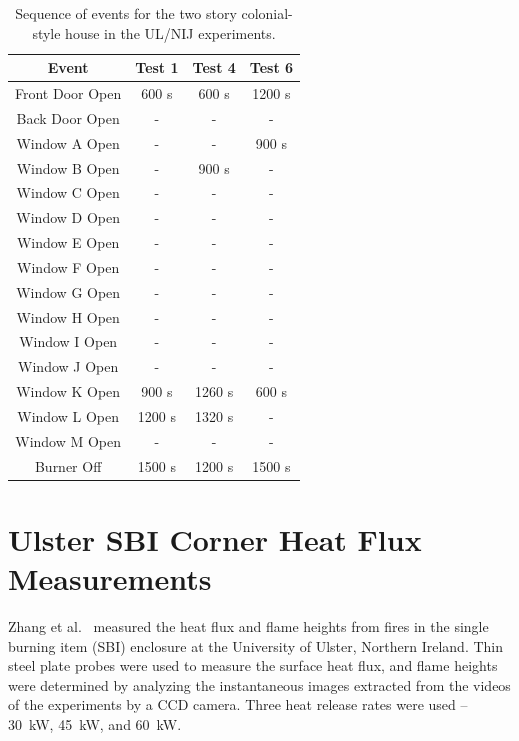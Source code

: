 \begin{table}[ht!]
\begin{center}
\begin{tabular}{|c||c|c|c|}
\hline
Event 			& Test 1  	& Test 4 	& Test 6 	\\ \hline \hline
Front Door Open & 600 s 	& 600 s 	& 1200 s 	\\ \hline
Back Door Open  & - 		& - 		& - 		\\ \hline
Window A Open  	& - 		& - 		& 900 s 	\\ \hline
Window B Open  	& - 		& 900 s 	& - 		\\ \hline
Window C Open  	& - 		& - 		& - 		\\ \hline
Window D Open  	& - 		& - 		& - 		\\ \hline
Window E Open  	& - 		& - 		& - 		\\ \hline
Window F Open  	& - 		& - 		& - 		\\ \hline
Window G Open  	& - 		& - 		& - 		\\ \hline
Window H Open  	& - 		& - 		& - 		\\ \hline
Window I Open  	& - 		& - 		& - 		\\ \hline
Window J Open  	& - 		& - 		& - 		\\ \hline
Window K Open  	& 900 s 	& 1260 s 	& 600 s 	\\ \hline
Window L Open  	& 1200 s 	& 1320 s 	& - 		\\ \hline
Window M Open  	& - 		& - 		& - 		\\ \hline
Burner Off 		& 1500 s 	& 1200 s 	& 1500 s 	\\ \hline
\end{tabular}
\end{center}
\caption[Sequence of events for the two story colonial-style house in the UL/NIJ experiments]
{Sequence of events for the two story colonial-style house in the UL/NIJ experiments.}
\label{Colonial_events}
\end{table}


\FloatBarrier

\section{Ulster SBI Corner Heat Flux Measurements}
\label{Ulster_SBI_Description}

Zhang et al.~\cite{Zhang:IAFSS9} measured the heat flux and flame heights from fires in the single burning item (SBI) enclosure at the University of Ulster, Northern Ireland. Thin steel plate probes were used to measure the surface heat flux, and flame heights were determined by analyzing the instantaneous images extracted from the videos of the experiments by a CCD camera. Three heat release rates were used -- 30~kW, 45~kW, and 60~kW.


